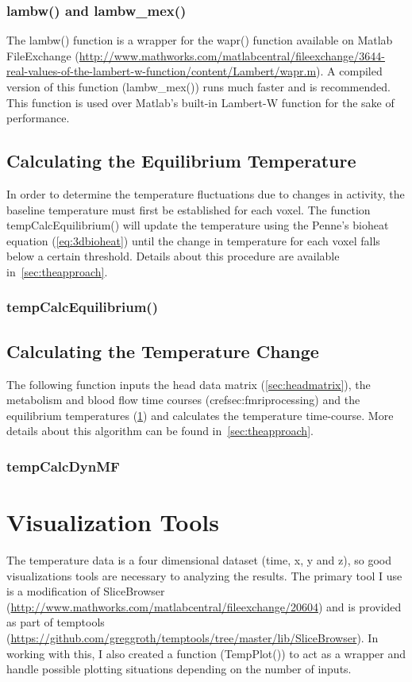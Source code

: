 \subsection{lambw() and lambw\_mex()}
The lambw() function is a wrapper for the wapr() function available on Matlab FileExchange (\url{http://www.mathworks.com/matlabcentral/fileexchange/3644-real-values-of-the-lambert-w-function/content/Lambert/wapr.m}).  A compiled version of this function (lambw\_mex()) runs much faster and is recommended.  This function is used over Matlab's built-in Lambert-W function for the sake of performance.

\clearpage
\section{Calculating the Equilibrium Temperature}
\label{sec:findequil}
In order to determine the temperature fluctuations due to changes in activity, the baseline temperature must first be established for each voxel.  The function tempCalcEquilibrium() will update the temperature using the Penne's bioheat equation (\cref{eq:3dbioheat}) until the change in temperature for each voxel falls below a certain threshold.  Details about this procedure are available in~\cref{sec:theapproach}.
\subsection{tempCalcEquilibrium()}

\clearpage
\section{Calculating the Temperature Change}
The following function inputs the head data matrix (\cref{sec:headmatrix}), the metabolism and blood flow time courses (cref{sec:fmriprocessing}) and the equilibrium temperatures (\cref{sec:findequil}) and calculates the temperature time-course.   More details about this algorithm can be found in~\cref{sec:theapproach}.
\subsection{tempCalcDynMF}

\chapter{Visualization Tools}
\label{ch:visualize}
The temperature data is a four dimensional dataset (time, x, y and z), so good visualizations tools are necessary to analyzing the results.  The primary tool I use is a modification of SliceBrowser (\url{http://www.mathworks.com/matlabcentral/fileexchange/20604}) and is provided as part of temptools (\url{https://github.com/greggroth/temptools/tree/master/lib/SliceBrowser}).  In working with this, I also created a function (TempPlot()) to act as a wrapper and handle possible plotting situations depending on the number of inputs.
